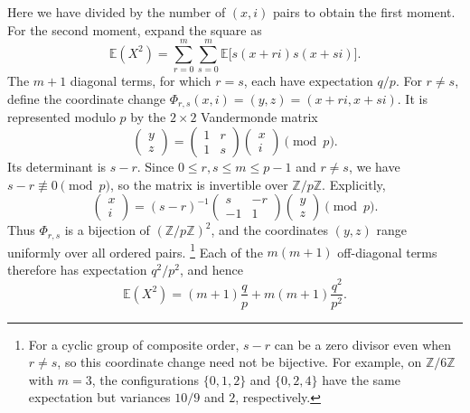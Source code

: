 \documentclass{article}
\begin{document}
Here we have divided by the number of $(x,i)$ pairs to obtain the first moment.
For the second moment, expand the square as
\begin{equation}
\mathbb{E}(X^2)
=\sum_{r=0}^{m}\sum_{s=0}^{m}
  \mathbb{E}\bigl[s(x+ri)s(x+si)\bigr].
\end{equation}
The $m+1$ diagonal terms, for which $r=s$, each have expectation $q/p$.
For $r\neq s$, define the coordinate change
$\Phi_{r,s}(x,i)=(y,z)=(x+ri,x+si)$. It is represented modulo $p$ by the
$2\times2$ Vandermonde matrix
\begin{equation}
\begin{pmatrix} y \\ z \end{pmatrix}
=
\begin{pmatrix} 1 & r \\ 1 & s \end{pmatrix}
\begin{pmatrix} x \\ i \end{pmatrix}
\pmod p.
\label{eq:vandermonde-change}
\end{equation}
Its determinant is $s-r$. Since $0\leq r,s\leq m\leq p-1$ and $r\neq s$,
we have $s-r\not\equiv0\pmod p$, so the matrix is invertible over
$\mathbb{Z}/p\mathbb{Z}$. Explicitly,
\begin{equation}
\begin{pmatrix} x \\ i \end{pmatrix}
=(s-r)^{-1}
\begin{pmatrix} s & -r \\ -1 & 1 \end{pmatrix}
\begin{pmatrix} y \\ z \end{pmatrix}
\pmod p.
\label{eq:vandermonde-inverse}
\end{equation}
Thus $\Phi_{r,s}$ is a bijection of $(\mathbb{Z}/p\mathbb{Z})^2$, and the
coordinates $(y,z)$ range uniformly over all ordered pairs.
\footnote{For a cyclic group of composite order, $s-r$ can be a zero divisor
even when $r\neq s$, so this coordinate change need not be bijective. For
example, on $\mathbb{Z}/6\mathbb{Z}$ with $m=3$, the configurations
$\{0,1,2\}$ and $\{0,2,4\}$ have the same expectation but variances
$10/9$ and $2$, respectively.}
Each of the $m(m+1)$ off-diagonal terms therefore has expectation $q^2/p^2$,
and hence
\begin{equation}
\mathbb{E}(X^2)
  =(m+1)\frac{q}{p}+m(m+1)\frac{q^2}{p^2}.
\label{eq:second-moment}
\end{equation}
\end{document}
